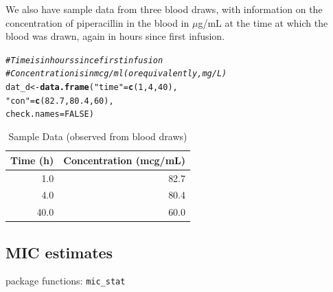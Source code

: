 \documentclass{article}\usepackage[]{graphicx}\usepackage[]{color}
\makeatletter
\newcommand{\hlnum}[1]{\textcolor[rgb]{0.686,0.059,0.569}{#1}}%
\newcommand{\hlstr}[1]{\textcolor[rgb]{0.192,0.494,0.8}{#1}}%
\newcommand{\hlcom}[1]{\textcolor[rgb]{0.678,0.584,0.686}{\textit{#1}}}%
\newcommand{\hlstd}[1]{\textcolor[rgb]{0.345,0.345,0.345}{#1}}%
\newcommand{\hlkwb}[1]{\textcolor[rgb]{0.69,0.353,0.396}{#1}}%
\newcommand{\hlkwc}[1]{\textcolor[rgb]{0.333,0.667,0.333}{#1}}%
\newcommand{\hlkwd}[1]{\textcolor[rgb]{0.737,0.353,0.396}{\textbf{#1}}}%
\newenvironment{kframe}{%
 \def\at@end@of@kframe{}%
 \ifinner\ifhmode%
  \def\at@end@of@kframe{\end{minipage}}%
  \begin{minipage}{\columnwidth}%
 \fi\fi%
 \def\FrameCommand##1{\hskip\@totalleftmargin \hskip-\fboxsep
 \colorbox{shadecolor}{##1}\hskip-\fboxsep
     \hskip-\linewidth \hskip-\@totalleftmargin \hskip\columnwidth}%
 \MakeFramed {\advance\hsize-\width
   \@totalleftmargin\z@ \linewidth\hsize
   \@setminipage}}%
 {\par\unskip\endMakeFramed%
 \at@end@of@kframe}
\newenvironment{knitrout}{}{} %
\makeatother
\begin{document}
We also have sample data from three blood draws, with information on the concentration of piperacillin in the blood in $\mu$g/mL at the time at which the blood was drawn, again in hours since first infusion.
\begin{knitrout}
\color{fgcolor}\begin{kframe}
\begin{alltt}
\hlcom{# Time is in hours since first infusion}
\hlcom{# Concentration is in mcg/ml (or equivalently, mg/L)}
\hlstd{dat_d} \hlkwb{<-} \hlkwd{data.frame}\hlstd{(}\hlstr{"time"} \hlstd{=} \hlkwd{c}\hlstd{(}\hlnum{1}\hlstd{,} \hlnum{4}\hlstd{,} \hlnum{40}\hlstd{),}
                    \hlstr{"con"} \hlstd{=} \hlkwd{c}\hlstd{(}\hlnum{82.7}\hlstd{,} \hlnum{80.4}\hlstd{,} \hlnum{60}\hlstd{),}
                    \hlkwc{check.names} \hlstd{=} \hlnum{FALSE}\hlstd{)}
\end{alltt}
\end{kframe}
\end{knitrout}

\begin{table}[ht]
\centering
\caption{Sample Data (observed from blood draws)} 
\begin{tabular}{rr}
  \hline
Time (h) & Concentration (mcg/mL) \\ 
  \hline
1.0 & 82.7 \\ 
  4.0 & 80.4 \\ 
  40.0 & 60.0 \\ 
   \hline
\end{tabular}
\end{table}



\subsection{MIC estimates}
package functions: \texttt{mic_stat}
\end{document}
